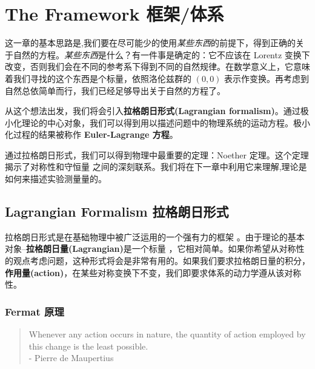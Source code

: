 
\newcommand\rd{\mathrm d}

\chapter[框架/体系]{The Framework 框架/体系}\label{chap4}
这一章的基本思路是,我们要在尽可能少的使用{\it 某些东西}的前提下，得到正确的关于自然的方程。{\it 某些东西}是什么？有一件事是确定的：它不应该在 Lorentz 变换下改变，否则我们会在不同的参考系下得到不同的自然规律。在数学意义上，它意味着我们寻找的这个东西是个标量，依照洛伦兹群的 \( (0,0) \) 表示作变换。再考虑到自然总依简单而行，我们已经足够导出关于自然的方程了。

从这个想法出发，我们将会引入{\bf 拉格朗日形式(Lagrangian formalism)}。通过极小化理论的中心对象，我们可以得到用以描述问题中的物理系统的运动方程。极小化过程的结果被称作 {\bf Euler-Lagrange 方程}。

通过拉格朗日形式，我们可以得到物理中最重要的定理：Noether 定理。这个定理揭示了对称性和守恒量%
%
之间的深刻联系。我们将在下一章中利用它来理解,理论是如何来描述实验测量量的。

\section[拉格朗日形式]{Lagrangian Formalism \quad 拉格朗日形式}\label{sec4.1}

拉格朗日形式是在基础物理中被广泛运用的一个强有力的框架%
%
。由于理论的基本对象--{\bf 拉格朗日量(Lagrangian)}是一个标量%
%
，它相对简单。如果你希望从对称性的观点考虑问题，这种形式将会是非常有用的。如果我们要求拉格朗日量的积分，{\bf 作用量(action)}，在某些对称变换下不变，我们即要求体系的动力学遵从该对称性。

\subsection{Fermat 原理}\label{sec4.1.1}
\begin{quote}
Whenever any action occurs in nature, the quantity of action employed by this change is the least possible.\\
- Pierre de Maupertius 
\end{quote}

